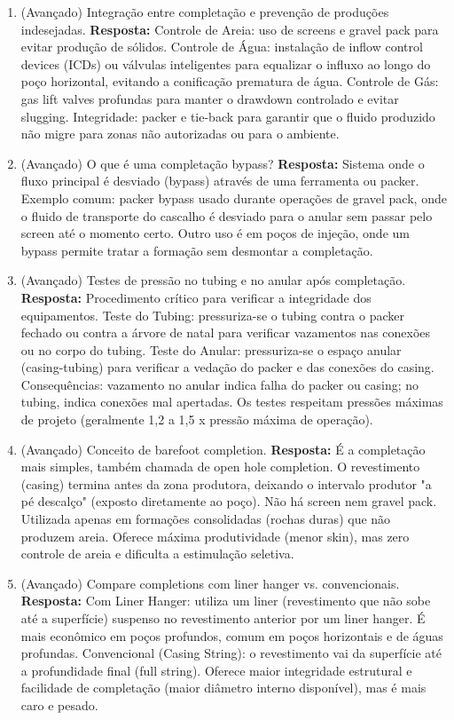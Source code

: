 \documentclass[11pt,a4paper]{article}
\begin{document}
\begin{enumerate}
  \item (Avançado) Integração entre completação e prevenção de produções indesejadas.
  \textbf{Resposta:} Controle de Areia: uso de screens e gravel pack para evitar produção de sólidos. Controle de Água: instalação de inflow control devices (ICDs) ou válvulas inteligentes para equalizar o influxo ao longo do poço horizontal, evitando a conificação prematura de água. Controle de Gás: gas lift valves profundas para manter o drawdown controlado e evitar slugging. Integridade: packer e tie-back para garantir que o fluido produzido não migre para zonas não autorizadas ou para o ambiente.

  \item (Avançado) O que é uma completação bypass?
  \textbf{Resposta:} Sistema onde o fluxo principal é desviado (bypass) através de uma ferramenta ou packer. Exemplo comum: packer bypass usado durante operações de gravel pack, onde o fluido de transporte do cascalho é desviado para o anular sem passar pelo screen até o momento certo. Outro uso é em poços de injeção, onde um bypass permite tratar a formação sem desmontar a completação.

  \item (Avançado) Testes de pressão no tubing e no anular após completação.
  \textbf{Resposta:} Procedimento crítico para verificar a integridade dos equipamentos. Teste do Tubing: pressuriza-se o tubing contra o packer fechado ou contra a árvore de natal para verificar vazamentos nas conexões ou no corpo do tubing. Teste do Anular: pressuriza-se o espaço anular (casing-tubing) para verificar a vedação do packer e das conexões do casing. Consequências: vazamento no anular indica falha do packer ou casing; no tubing, indica conexões mal apertadas. Os testes respeitam pressões máximas de projeto (geralmente 1,2 a 1,5 x pressão máxima de operação).

  \item (Avançado) Conceito de barefoot completion.
  \textbf{Resposta:} É a completação mais simples, também chamada de open hole completion. O revestimento (casing) termina antes da zona produtora, deixando o intervalo produtor "a pé descalço" (exposto diretamente ao poço). Não há screen nem gravel pack. Utilizada apenas em formações consolidadas (rochas duras) que não produzem areia. Oferece máxima produtividade (menor skin), mas zero controle de areia e dificulta a estimulação seletiva.

  \item (Avançado) Compare completions com liner hanger vs. convencionais.
  \textbf{Resposta:} Com Liner Hanger: utiliza um liner (revestimento que não sobe até a superfície) suspenso no revestimento anterior por um liner hanger. É mais econômico em poços profundos, comum em poços horizontais e de águas profundas. Convencional (Casing String): o revestimento vai da superfície até a profundidade final (full string). Oferece maior integridade estrutural e facilidade de completação (maior diâmetro interno disponível), mas é mais caro e pesado.


\end{enumerate}
\end{document}
